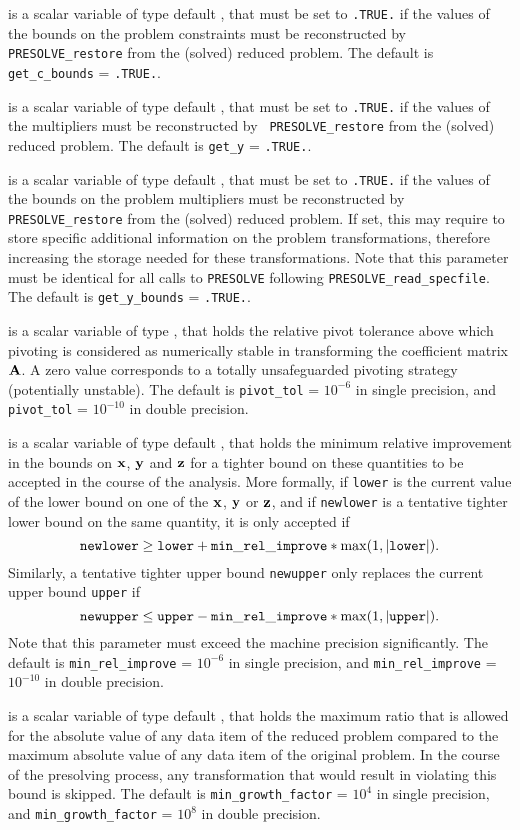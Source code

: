 \documentclass{galahad}
\newcommand{\packagename}{PRESOLVE}
\begin{document}
\begin{description}
 is a scalar variable of type default \logical, that
must be set to {\tt .TRUE.} if the values of the bounds on the
problem constraints must be reconstructed by {\tt \packagename\_restore}
from the (solved) reduced problem.
The default is {\tt get\_c\_bounds} = {\tt .TRUE.}.

 is a scalar variable of type default \logical, that
must be set to {\tt .TRUE.} if the values of the multipliers
must be reconstructed by {\tt
\packagename\_restore} from the (solved) reduced problem.
The default is {\tt get\_y} = {\tt .TRUE.}.

 is a scalar variable of type default \logical, that
must be set to {\tt .TRUE.} if the values of the bounds on the
problem multipliers must be reconstructed by {\tt \packagename\_restore}
from the (solved) reduced problem.
If set, this may require to store specific
additional information on the problem transformations,
therefore increasing the storage needed for these transformations.
Note that this parameter must be identical for all calls to
{\tt \packagename} following {\tt \packagename\_read\_specfile}.
The default is {\tt get\_y\_bounds} = {\tt .TRUE.}.

 is a scalar variable of type \realdp, that
holds the relative pivot tolerance above which pivoting is
considered as numerically stable in transforming the
coefficient matrix ${\mathbf{A}}$.  A zero value corresponds to a
totally unsafeguarded pivoting strategy (potentially unstable).
The default is {\tt pivot\_tol} = $10^{-6}$ in single precision, and
{\tt pivot\_tol} = $10^{-10}$ in double precision.

  is a scalar variable of type default
\realdp, that holds the minimum relative improvement in the bounds on ${\mathbf{x}}$,
${\mathbf{y}}$ and ${\mathbf{z}}$ for a tighter bound on these quantities to be
accepted in the course of the analysis.  More formally,
if {\tt lower} is the current value of the lower bound on one
of the ${\mathbf{x}}$, ${\mathbf{y}}$ or ${\mathbf{z}}$, and if {\tt newlower} is a tentative tighter
lower bound on the same quantity, it is only accepted if
\[
{\tt newlower} \geq
{\tt lower} + {\tt min\_rel\_improve} * \max( 1, |{\tt lower}|).
\]
Similarly, a tentative tighter upper bound {\tt newupper}
only replaces the current upper bound {\tt upper} if
\[
{\tt newupper} \leq
{\tt upper} - {\tt min\_rel\_improve} * \max( 1, |{\tt upper}|).
\]
Note that this parameter must exceed the machine precision significantly.
The default is {\tt min\_rel\_improve} = $10^{-6}$ in single
precision, and {\tt min\_rel\_improve} = $10^{-10}$ in double
precision.

 is a scalar variable of type default
\realdp, that holds the maximum ratio that is allowed for the absolute
value of any data item of the reduced problem compared to the maximum
absolute value of any data item of the original problem.  In the
course of the presolving process, any transformation that would result in
violating this bound is skipped.
The default is {\tt min\_growth\_factor} = $10^{4}$ in single
precision, and {\tt min\_growth\_factor} = $10^{8}$ in double
precision.

\end{description}
\end{document}
